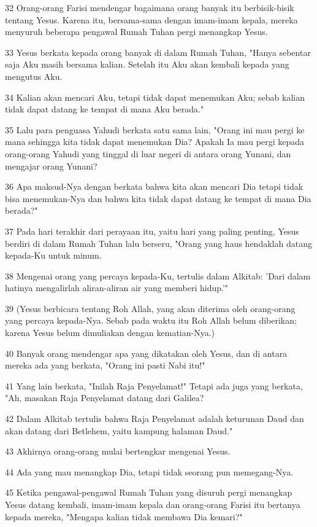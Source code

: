 \par 32 Orang-orang Farisi mendengar bagaimana orang banyak itu berbisik-bisik tentang Yesus. Karena itu, bersama-sama dengan imam-imam kepala, mereka menyuruh beberapa pengawal Rumah Tuhan pergi menangkap Yesus.
\par 33 Yesus berkata kepada orang banyak di dalam Rumah Tuhan, "Hanya sebentar saja Aku masih bersama kalian. Setelah itu Aku akan kembali kepada yang mengutus Aku.
\par 34 Kalian akan mencari Aku, tetapi tidak dapat menemukan Aku; sebab kalian tidak dapat datang ke tempat di mana Aku berada."
\par 35 Lalu para penguasa Yahudi berkata satu sama lain, "Orang ini mau pergi ke mana sehingga kita tidak dapat menemukan Dia? Apakah Ia mau pergi kepada orang-orang Yahudi yang tinggal di luar negeri di antara orang Yunani, dan mengajar orang Yunani?
\par 36 Apa maksud-Nya dengan berkata bahwa kita akan mencari Dia tetapi tidak bisa menemukan-Nya dan bahwa kita tidak dapat datang ke tempat di mana Dia berada?"
\par 37 Pada hari terakhir dari perayaan itu, yaitu hari yang paling penting, Yesus berdiri di dalam Rumah Tuhan lalu berseru, "Orang yang haus hendaklah datang kepada-Ku untuk minum.
\par 38 Mengenai orang yang percaya kepada-Ku, tertulis dalam Alkitab: 'Dari dalam hatinya mengalirlah aliran-aliran air yang memberi hidup.'"
\par 39 (Yesus berbicara tentang Roh Allah, yang akan diterima oleh orang-orang yang percaya kepada-Nya. Sebab pada waktu itu Roh Allah belum diberikan; karena Yesus belum dimuliakan dengan kematian-Nya.)
\par 40 Banyak orang mendengar apa yang dikatakan oleh Yesus, dan di antara mereka ada yang berkata, "Orang ini pasti Nabi itu!"
\par 41 Yang lain berkata, "Inilah Raja Penyelamat!" Tetapi ada juga yang berkata, "Ah, masakan Raja Penyelamat datang dari Galilea?
\par 42 Dalam Alkitab tertulis bahwa Raja Penyelamat adalah keturunan Daud dan akan datang dari Betlehem, yaitu kampung halaman Daud."
\par 43 Akhirnya orang-orang mulai bertengkar mengenai Yesus.
\par 44 Ada yang mau menangkap Dia, tetapi tidak seorang pun memegang-Nya.
\par 45 Ketika pengawal-pengawal Rumah Tuhan yang disuruh pergi menangkap Yesus datang kembali, imam-imam kepala dan orang-orang Farisi itu bertanya kepada mereka, "Mengapa kalian tidak membawa Dia kemari?"

